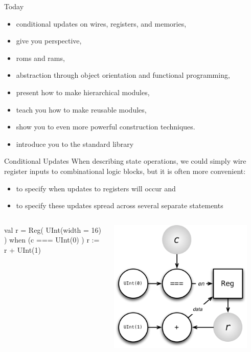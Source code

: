 \documentclass[xcolor=pdflatex,dvipsnames,table]{beamer}
\begin{document}
\begin{frame}[fragile]{Today}
\begin{itemize}
\item conditional updates on wires, registers, and memories,
\item give you perspective,
\item roms and rams,
\item abstraction through object orientation and functional programming,
\item present how to make hierarchical modules, 
\item teach you how to make reusable modules,
\item show you to even more powerful construction techniques.
\item introduce you to the standard library
\end{itemize}
\end{frame}

\begin{frame}[fragile]{Conditional Updates}
When describing state operations, we could simply wire register inputs to combinational logic blocks, but it is often more convenient:
\begin{itemize}
\item to specify when updates to registers will occur and
\item to specify these updates spread across several separate statements
\end{itemize}

\begin{columns}
\begin{scala}
val r = Reg( UInt(width = 16) )
when (c === UInt(0) ) {
  r := r + UInt(1)
}
\end{scala}


\begin{center}
\includegraphics[width=0.9\textwidth]{figs/conditional-increment.pdf} 
\end{center}

\end{columns}
\end{frame}
\end{document}
